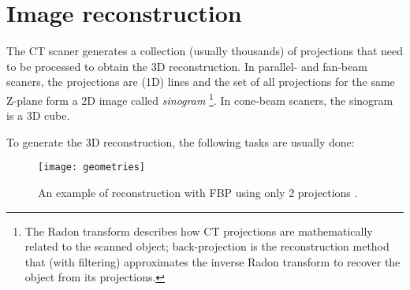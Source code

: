 \section{Image reconstruction}
The CT scaner generates a collection (usually thousands) of
projections that need to be processed to obtain the 3D
reconstruction. In parallel- and fan-beam scaners, the projections are
(1D) lines and the set of all projections for the same Z-plane form a
2D image called \emph{sinogram}
\cite{wikipedia2025radom_transform}\footnote{The Radon transform
  describes how CT projections are mathematically related to the
  scanned object; back-projection is the reconstruction method that
  (with filtering) approximates the inverse Radon transform to recover
  the object from its projections.}. In cone-beam scaners, the
sinogram is a 3D cube.

To generate the 3D reconstruction, the following tasks are usually done:

\begin{figure}
  \centering
  \texttt{[image: geometries]}
  \caption{An example of reconstruction with FBP using only 2
    projections
    \cite{abdulla2025acquiring2}.\label{fig:CT_reconstruction}}
\end{figure}

